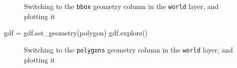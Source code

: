 \documentclass[
  letterpaper,
]{krantz}
\newenvironment{Shaded}{\begin{snugshade}}{\end{snugshade}}
\newcommand{\NormalTok}[1]{\textcolor[rgb]{0.00,0.23,0.31}{#1}}
\newcommand{\OperatorTok}[1]{\textcolor[rgb]{0.37,0.37,0.37}{#1}}
\newcommand{\StringTok}[1]{\textcolor[rgb]{0.13,0.47,0.30}{#1}}
\begin{document}
\begin{figure}


\caption{\label{fig-switch-to-centroids}Switching to the
\texttt{\textquotesingle{}bbox\textquotesingle{}} geometry column in the
\texttt{world} layer, and plotting it}

\end{figure}%

\begin{Shaded}
\begin{Highlighting}[]
\NormalTok{gdf }\OperatorTok{=}\NormalTok{ gdf.set\_geometry(}\StringTok{\textquotesingle{}polygon\textquotesingle{}}\NormalTok{)}
\NormalTok{gdf.explore()}
\end{Highlighting}
\end{Shaded}

\begin{figure}


\caption{\label{fig-switch-to-polygons}Switching to the
\texttt{\textquotesingle{}polygons\textquotesingle{}} geometry column in
the \texttt{world} layer, and plotting it}

\end{figure}%
\end{document}
